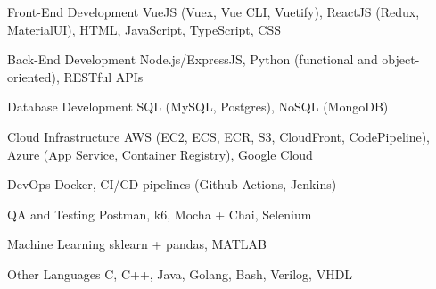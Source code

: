 \newcommand{\Csh}{C{\lserif\#}}



\begin{cvskills}




\cvskill
{Front-End Development} %
{VueJS (Vuex, Vue CLI, Vuetify), ReactJS (Redux, MaterialUI), HTML, JavaScript, TypeScript, CSS} %


\cvskill
{Back-End Development} %
{Node.js/ExpressJS, Python (functional and object-oriented), RESTful APIs} %


\cvskill
{Database Development} %
{SQL (MySQL, Postgres), NoSQL (MongoDB)} %


\cvskill
{Cloud Infrastructure} %
{AWS (EC2, ECS, ECR, S3, CloudFront, CodePipeline), Azure (App Service, Container Registry), Google Cloud} %


\cvskill
{DevOps} %
{Docker, CI/CD pipelines (Github Actions, Jenkins)} %


\cvskill
{QA and Testing} %
{Postman, k6, Mocha + Chai, Selenium} %


\cvskill
{Machine Learning} %
{sklearn + pandas, MATLAB} %


\cvskill
{Other Languages} %
{C, C++, Java, Golang, Bash, Verilog, VHDL} %


\end{cvskills}